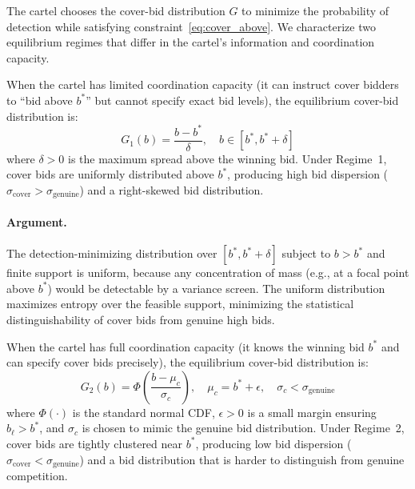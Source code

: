 The cartel chooses the cover-bid distribution $G$ to minimize the
probability of detection while satisfying constraint~\eqref{eq:cover_above}.
We characterize two equilibrium regimes that differ in the cartel's
information and coordination capacity.

\begin{proposition}
\label{prop:regime1}
When the cartel has limited coordination capacity (it can instruct cover
bidders to ``bid above $b^*$'' but cannot specify exact bid levels), the
equilibrium cover-bid distribution is:
\begin{equation}
  G_1(b) = \frac{b - b^*}{\delta}, \quad b \in [b^*, b^* + \delta]
  \label{eq:regime1}
\end{equation}
where $\delta > 0$ is the maximum spread above the winning bid. Under
Regime~1, cover bids are uniformly distributed above $b^*$, producing
high bid dispersion ($\sigma_{\text{cover}} > \sigma_{\text{genuine}}$)
and a right-skewed bid distribution.
\end{proposition}

\paragraph{Argument.}
The detection-minimizing distribution over $[b^*, b^* + \delta]$
subject to $b > b^*$ and finite support is uniform, because any
concentration of mass (e.g., at a focal point above $b^*$) would be
detectable by a variance screen. The uniform distribution maximizes
entropy over the feasible support, minimizing the statistical
distinguishability of cover bids from genuine high bids.



\begin{proposition}
\label{prop:regime2}
When the cartel has full coordination capacity (it knows the winning bid
$b^*$ and can specify cover bids precisely), the equilibrium cover-bid
distribution is:
\begin{equation}
  G_2(b) = \Phi\!\left(\frac{b - \mu_c}{\sigma_c}\right),
  \quad \mu_c = b^* + \epsilon, \quad
  \sigma_c < \sigma_{\text{genuine}}
  \label{eq:regime2}
\end{equation}
where $\Phi(\cdot)$ is the standard normal CDF, $\epsilon > 0$ is a
small margin ensuring $b_\ell > b^*$, and $\sigma_c$ is chosen to mimic
the genuine bid distribution. Under Regime~2, cover bids are tightly
clustered near $b^*$, producing low bid dispersion
($\sigma_{\text{cover}} < \sigma_{\text{genuine}}$) and a bid
distribution that is harder to distinguish from genuine competition.
\end{proposition}


